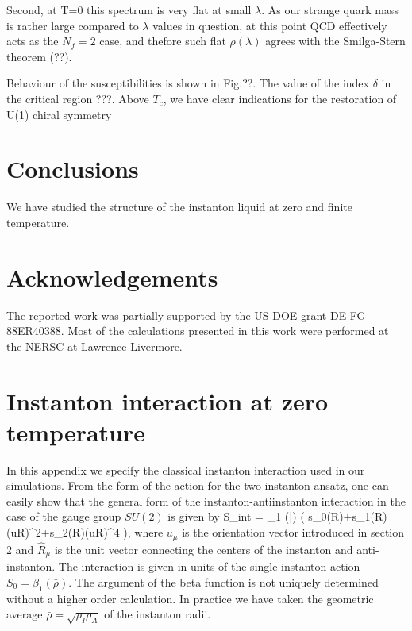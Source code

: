    Second, at T=0 this spectrum is very flat at small $\lambda$.
As our strange quark mass is rather large compared
to $\lambda$ values in question,
at this point QCD effectively acts as the $N_f=2$ case,
 and thefore such flat $\rho(\lambda)$
agrees with the Smilga-Stern theorem (??).

   Behaviour of the susceptibilities is shown in Fig.??.
The value of the index $\delta$ in the critical region ???.
Above $T_c$, we have clear indications for the restoration of U(1)
chiral symmetry

\section{Conclusions}

   We have studied the structure of the instanton liquid at zero
and finite temperature.

\section{Acknowledgements}
  The reported work was partially supported by the US DOE grant
DE-FG-88ER40388. Most of the calculations presented in this work
were performed at the NERSC at Lawrence Livermore.

\newpage
\appendix

\section{Instanton interaction at zero temperature}

    In this appendix we specify the classical instanton interaction
used in our simulations. From the form of the action for the
two-instanton ansatz, one can easily show that the general form
of the instanton-antiinstanton interaction in the case of the
gauge group $SU(2)$ is given by
\be
\label{su2_int}
 S_{int} = \beta_1 (\bar\rho) \left(
  s_0(R)+s_1(R)(u\cdot\hat R)^2+s_2(R)(u\cdot\hat R)^4  \right),
\ee
where $u_\mu$ is the orientation vector introduced in section 2 and
$\hat R_\mu$ is the unit vector connecting the centers of the
instanton and anti-instanton. The interaction is given in units
of the single instanton action $S_0=\beta_1(\bar\rho)$. The argument
of the beta function is not uniquely determined without a higher
order calculation. In practice we have taken the geometric average
$\bar\rho=\sqrt{\rho_I\rho_A}$ of the instanton radii.

